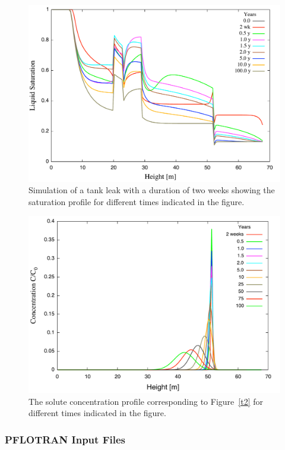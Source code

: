 \begin{figure}[h]\centering
\includegraphics[scale=0.45]{./figs/sat_leak}
\caption{Simulation of a tank leak with a duration of two weeks showing the saturation profile for different times indicated in the figure.}\label{f2}
\end{figure}

\begin{figure}[h]\centering
\includegraphics[scale=0.45]{./figs/conc}
\caption{The solute concentration profile corresponding to Figure~\ref{t2} for different times indicated in the figure.}\label{f3}
\end{figure}

\clearpage

\subsubsection{PFLOTRAN Input Files}

